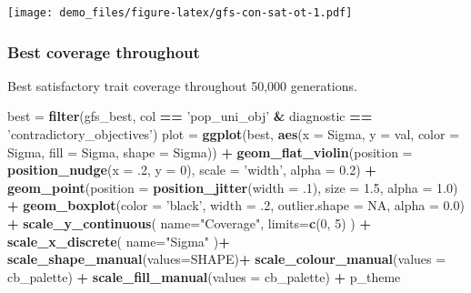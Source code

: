 \documentclass[]{book}
\newenvironment{Shaded}{\begin{snugshade}}{\end{snugshade}}
\newcommand{\DataTypeTok}[1]{\textcolor[rgb]{0.13,0.29,0.53}{#1}}
\newcommand{\DecValTok}[1]{\textcolor[rgb]{0.00,0.00,0.81}{#1}}
\newcommand{\FloatTok}[1]{\textcolor[rgb]{0.00,0.00,0.81}{#1}}
\newcommand{\KeywordTok}[1]{\textcolor[rgb]{0.13,0.29,0.53}{\textbf{#1}}}
\newcommand{\NormalTok}[1]{#1}
\newcommand{\OperatorTok}[1]{\textcolor[rgb]{0.81,0.36,0.00}{\textbf{#1}}}
\newcommand{\OtherTok}[1]{\textcolor[rgb]{0.56,0.35,0.01}{#1}}
\newcommand{\StringTok}[1]{\textcolor[rgb]{0.31,0.60,0.02}{#1}}
\begin{document}
\texttt{[image: demo\_files/figure-latex/gfs-con-sat-ot-1.pdf]}

\hypertarget{best-coverage-throughout-4}{%
\subsubsection{Best coverage throughout}\label{best-coverage-throughout-4}}

Best satisfactory trait coverage throughout 50,000 generations.

\begin{Shaded}
\begin{Highlighting}[]
\NormalTok{best =}\StringTok{ }\KeywordTok{filter}\NormalTok{(gfs_best, col }\OperatorTok{==}\StringTok{ 'pop_uni_obj'} \OperatorTok{&}\StringTok{ }\NormalTok{diagnostic }\OperatorTok{==}\StringTok{ 'contradictory_objectives'}\NormalTok{)}
\NormalTok{plot =}\StringTok{ }\KeywordTok{ggplot}\NormalTok{(best, }\KeywordTok{aes}\NormalTok{(}\DataTypeTok{x =}\NormalTok{ Sigma, }\DataTypeTok{y =}\NormalTok{ val, }\DataTypeTok{color =}\NormalTok{ Sigma, }\DataTypeTok{fill =}\NormalTok{ Sigma, }\DataTypeTok{shape =}\NormalTok{ Sigma)) }\OperatorTok{+}
\StringTok{  }\KeywordTok{geom_flat_violin}\NormalTok{(}\DataTypeTok{position =} \KeywordTok{position_nudge}\NormalTok{(}\DataTypeTok{x =} \FloatTok{.2}\NormalTok{, }\DataTypeTok{y =} \DecValTok{0}\NormalTok{), }\DataTypeTok{scale =} \StringTok{'width'}\NormalTok{, }\DataTypeTok{alpha =} \FloatTok{0.2}\NormalTok{) }\OperatorTok{+}
\StringTok{  }\KeywordTok{geom_point}\NormalTok{(}\DataTypeTok{position =} \KeywordTok{position_jitter}\NormalTok{(}\DataTypeTok{width =} \FloatTok{.1}\NormalTok{), }\DataTypeTok{size =} \FloatTok{1.5}\NormalTok{, }\DataTypeTok{alpha =} \FloatTok{1.0}\NormalTok{) }\OperatorTok{+}
\StringTok{  }\KeywordTok{geom_boxplot}\NormalTok{(}\DataTypeTok{color =} \StringTok{'black'}\NormalTok{, }\DataTypeTok{width =} \FloatTok{.2}\NormalTok{, }\DataTypeTok{outlier.shape =} \OtherTok{NA}\NormalTok{, }\DataTypeTok{alpha =} \FloatTok{0.0}\NormalTok{) }\OperatorTok{+}
\StringTok{  }\KeywordTok{scale_y_continuous}\NormalTok{(}
    \DataTypeTok{name=}\StringTok{"Coverage"}\NormalTok{,}
    \DataTypeTok{limits=}\KeywordTok{c}\NormalTok{(}\DecValTok{0}\NormalTok{, }\DecValTok{5}\NormalTok{)}
\NormalTok{  ) }\OperatorTok{+}
\StringTok{  }\KeywordTok{scale_x_discrete}\NormalTok{(}
    \DataTypeTok{name=}\StringTok{"Sigma"}
\NormalTok{  )}\OperatorTok{+}
\StringTok{  }\KeywordTok{scale_shape_manual}\NormalTok{(}\DataTypeTok{values=}\NormalTok{SHAPE)}\OperatorTok{+}
\StringTok{  }\KeywordTok{scale_colour_manual}\NormalTok{(}\DataTypeTok{values =}\NormalTok{ cb_palette) }\OperatorTok{+}
\StringTok{  }\KeywordTok{scale_fill_manual}\NormalTok{(}\DataTypeTok{values =}\NormalTok{ cb_palette) }\OperatorTok{+}
\StringTok{  }\NormalTok{p_theme}


\end{Highlighting}
\end{Shaded}
\end{document}
